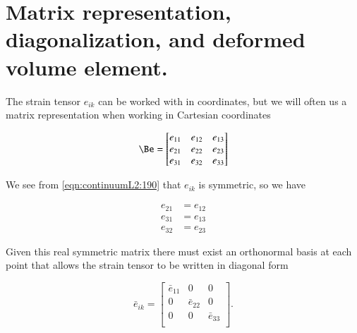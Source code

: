 % 
% 
% 
% 
% 
% 
% 
% 
% 
% 
% 
% 


\section{Matrix representation, diagonalization, and deformed volume element.}

The strain tensor $e_{ik}$ can be worked with in coordinates, but we will often us a matrix representation when working in Cartesian coordinates 

\begin{equation}\label{eqn:continuumL2:210}
\Be = 
\begin{bmatrix}
e_{11} & e_{12} & e_{13} \\
e_{21} & e_{22} & e_{23} \\
e_{31} & e_{32} & e_{33} \\
\end{bmatrix}
\end{equation}

We see from \ref{eqn:continuumL2:190} that $e_{ik}$ is symmetric, so we have

\begin{align}\label{eqn:continuumL2:230}
e_{21} &= e_{12} \\
e_{31} &= e_{13} \\
e_{32} &= e_{23}
\end{align}

Given this real symmetric matrix there must exist an orthonormal basis at each point that allows the strain tensor to be written in diagonal form 

\begin{equation}\label{eqn:continuumL2:250}
\bar{e}_{ik} =
\begin{bmatrix}
\bar{e}_{11} & 0 & 0 \\
0 & \bar{e}_{22} & 0 \\
0 & 0 & \bar{e}_{33} \\
\end{bmatrix}.
\end{equation}

